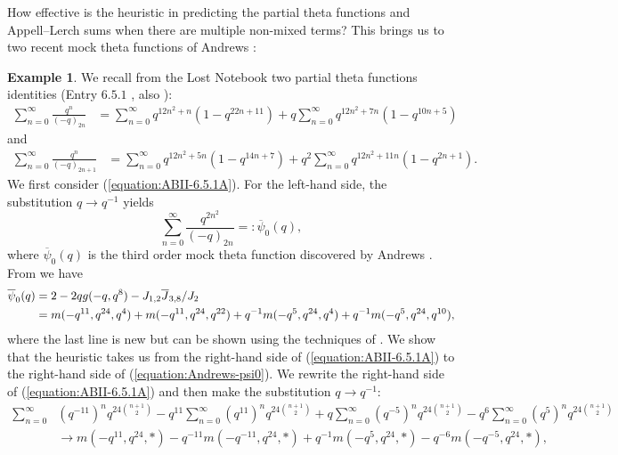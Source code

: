 \documentclass[12pt,reqno]{amsart}
\theoremstyle{remark}
\theoremstyle{definition}
\newtheorem{example}{Example}
\numberwithin{theorem}{section} \numberwithin{equation}{section}
\numberwithin{example}{section}
\begin{document}
How effective is the heuristic in predicting the partial theta functions and Appell--Lerch sums when there are multiple non-mixed terms?  This brings us to two recent mock theta functions of Andrews \cite{A2}:
\begin{example}\label{example:ex-2}
We recall from the Lost Notebook two partial theta functions identities ({Entry $6.5.1$ \cite{ABII}, also \cite[p. 31]{RLN}}):
\begin{align}
\sum_{n=0}^{\infty}\frac{q^n}{(-q)_{2n}}
&=\sum_{n=0}^{\infty}q^{12n^2+n}(1-q^{22n+11})+q\sum_{n=0}^{\infty}q^{12n^2+7n}(1-q^{10n+5})\label{equation:ABII-6.5.1A}
\end{align}
and
\begin{align}
\sum_{n=0}^{\infty}\frac{q^n}{(-q)_{2n+1}}
&=\sum_{n=0}^{\infty}q^{12n^2+5n}(1-q^{14n+7})+q^2\sum_{n=0}^{\infty}q^{12n^2+11n}(1-q^{2n+1}).\label{equation:ABII-6.5.1B}
\end{align}
We first consider (\ref{equation:ABII-6.5.1A}).  For the left-hand side, the substitution $q\rightarrow q^{-1}$ yields
\begin{equation}
\sum_{n=0}^{\infty}\frac{q^{2n^2}}{(-q)_{2n}}=:\overline{\psi}_0(q),
\end{equation}
where $\overline{\psi}_0(q)$ is the third order mock theta function discovered by Andrews \cite[$(1.14)$]{A2}.  From \cite[Theorem $1.5$]{M1} we have
\begin{align}
\overline{\psi}_0(q)&=2-2qg(-q,q^8)-{J_{1,2}\overline{J}_{3,8}}/{J_{2}}\label{equation:Andrews-psi0}\\
&=m(-q^{11},q^{24},q^{4})+m(-q^{11},q^{24},q^{22})+q^{-1}m(-q^5,q^{24},q^4)+q^{-1}m(-q^5,q^{24},q^{10}),\notag
\end{align}
where the last line is new but can be shown using the techniques of \cite{HM}.  We show that the heuristic takes us from the right-hand side of (\ref{equation:ABII-6.5.1A}) to the right-hand side of (\ref{equation:Andrews-psi0}).  We rewrite the right-hand side of (\ref{equation:ABII-6.5.1A}) and then make the substitution $q\rightarrow q^{-1}$:
\begin{align*}
\sum_{n=0}^{\infty}&(q^{-11})^nq^{24\binom{n+1}{2}}-q^{11}\sum_{n=0}^{\infty}(q^{11})^nq^{24\binom{n+1}{2}}+q\sum_{n=0}^{\infty}(q^{-5})^nq^{24\binom{n+1}{2}}
-q^6\sum_{n=0}^{\infty}(q^{5})^nq^{24\binom{n+1}{2}}\\
&\rightarrow  m(-q^{11},q^{24}, *)- q^{-11}m(-q^{-11},q^{24}, *) +q^{-1} m(-q^{5},q^{24}, *) -q^{-6}m(-q^{-5},q^{24}, *),
\end{align*}

\end{example}
\end{document}
